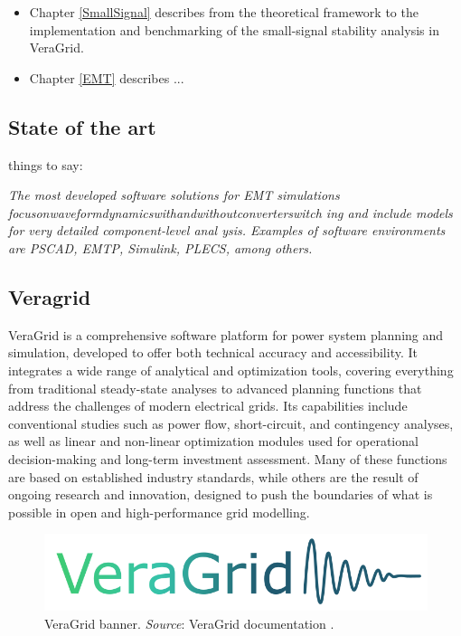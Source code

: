 \begin{itemize}
  \item Chapter \ref{SmallSignal} describes from the theoretical framework to the implementation and benchmarking of the small-signal 
stability analysis in VeraGrid.
  \item Chapter \ref{EMT} describes ...
\end{itemize}

\subsection{State of the art}

things to say:

\textit{The most developed software solutions for EMT simulations
 focusonwaveformdynamicswithandwithoutconverterswitch
ing and include models for very detailed component-level anal
ysis. Examples of software environments are PSCAD, EMTP,
 Simulink, PLECS, among others.}


\subsection{Veragrid}

VeraGrid is a comprehensive software platform for power system planning and simulation, developed to offer both technical accuracy and accessibility. 
It integrates a wide range of analytical and optimization tools, covering everything from traditional steady-state analyses to advanced planning functions 
that address the challenges of modern electrical grids. Its capabilities include conventional studies such as power flow, short-circuit, and contingency analyses, 
as well as linear and non-linear optimization modules used for operational decision-making and long-term investment assessment. Many of these functions are based on 
established industry standards, while others are the result of ongoing research and innovation, designed to push the boundaries of what is possible in open and high-performance 
grid modelling.

\begin{figure}[H]
  \centering
  \includegraphics[width=0.8\linewidth]{figures/VeraGrid_banner.png}
  \caption{VeraGrid banner. \textit{Source}: VeraGrid documentation \cite{veragrid}.}
  \label{fig:VeraGrid_banner}
\end{figure}

